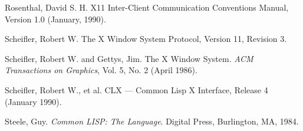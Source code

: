 \documentclass[twoside]{book}
\begin{document}
\begin{sloppy}
\begin{thebibliography}{9}
 Rosenthal, David S. H. X11 Inter-Client Communication Conventions
Manual, Version 1.0 (January, 1990).


 Scheifler, Robert W. The X Window System Protocol, Version
11, Revision 3.

 Scheifler, Robert W. and Gettys, Jim. The X Window
System. {\em ACM Transactions on Graphics}, Vol. 5, No. 2 (April 1986).

 Scheifler, Robert W., et al. CLX --- Common Lisp X Interface,
Release 4 (January 1990).

 Steele, Guy. {\em Common LISP: The Language}. Digital Press,
Burlington, MA, 1984.


\end{thebibliography}


\printindex

\end{sloppy}
\end{document}
